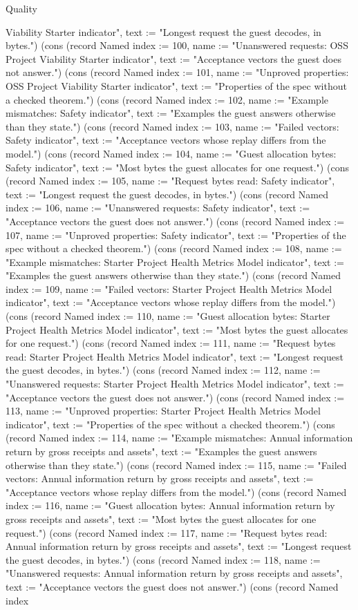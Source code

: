 \begin{lexlean}{Quality}
\begin{semanticmodule}
{Viability Starter indicator", text := "Longest request the guest decodes, in bytes."}) (cons (record Named {index := 100, name := "Unanswered requests: OSS Project Viability Starter indicator", text := "Acceptance vectors the guest does not answer."}) (cons (record Named {index := 101, name := "Unproved properties: OSS Project Viability Starter indicator", text := "Properties of the spec without a checked theorem."}) (cons (record Named {index := 102, name := "Example mismatches: Safety indicator", text := "Examples the guest answers otherwise than they state."}) (cons (record Named {index := 103, name := "Failed vectors: Safety indicator", text := "Acceptance vectors whose replay differs from the model."}) (cons (record Named {index := 104, name := "Guest allocation bytes: Safety indicator", text := "Most bytes the guest allocates for one request."}) (cons (record Named {index := 105, name := "Request bytes read: Safety indicator", text := "Longest request the guest decodes, in bytes."}) (cons (record Named {index := 106, name := "Unanswered requests: Safety indicator", text := "Acceptance vectors the guest does not answer."}) (cons (record Named {index := 107, name := "Unproved properties: Safety indicator", text := "Properties of the spec without a checked theorem."}) (cons (record Named {index := 108, name := "Example mismatches: Starter Project Health Metrics Model indicator", text := "Examples the guest answers otherwise than they state."}) (cons (record Named {index := 109, name := "Failed vectors: Starter Project Health Metrics Model indicator", text := "Acceptance vectors whose replay differs from the model."}) (cons (record Named {index := 110, name := "Guest allocation bytes: Starter Project Health Metrics Model indicator", text := "Most bytes the guest allocates for one request."}) (cons (record Named {index := 111, name := "Request bytes read: Starter Project Health Metrics Model indicator", text := "Longest request the guest decodes, in bytes."}) (cons (record Named {index := 112, name := "Unanswered requests: Starter Project Health Metrics Model indicator", text := "Acceptance vectors the guest does not answer."}) (cons (record Named {index := 113, name := "Unproved properties: Starter Project Health Metrics Model indicator", text := "Properties of the spec without a checked theorem."}) (cons (record Named {index := 114, name := "Example mismatches: Annual information return by gross receipts and assets", text := "Examples the guest answers otherwise than they state."}) (cons (record Named {index := 115, name := "Failed vectors: Annual information return by gross receipts and assets", text := "Acceptance vectors whose replay differs from the model."}) (cons (record Named {index := 116, name := "Guest allocation bytes: Annual information return by gross receipts and assets", text := "Most bytes the guest allocates for one request."}) (cons (record Named {index := 117, name := "Request bytes read: Annual information return by gross receipts and assets", text := "Longest request the guest decodes, in bytes."}) (cons (record Named {index := 118, name := "Unanswered requests: Annual information return by gross receipts and assets", text := "Acceptance vectors the guest does not answer."}) (cons (record Named {index }
\end{semanticmodule}
\end{lexlean}
